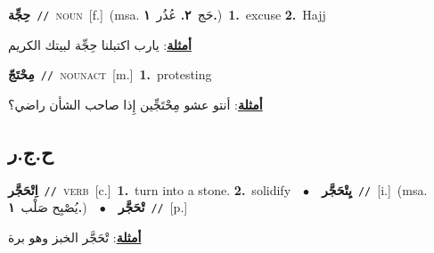 \documentclass[10pt,a4paper,twoside]{article} %
\begin{document}
\begin{multicols}{2}
{{{{{{{{{{{\setlength\topsep{0pt}\textbf{\foreignlanguage{arabic}{حِجِّة}}\ {\color{gray}\texttt{//}\color{black}}\ \textsc{noun}\ [f.]\ \color{gray}(msa. \foreignlanguage{arabic}{حَج}~\foreignlanguage{arabic}{\textbf{٢.}}  \foreignlanguage{arabic}{عُذُر}~\foreignlanguage{arabic}{\textbf{١.}})\color{black}\ \textbf{1.}~excuse  \textbf{2.}~Hajj\  \begin{flushright}\color{gray}\foreignlanguage{arabic}{\textbf{\underline{\foreignlanguage{arabic}{أمثلة}}}: يارب اكتبلنا حِجِّة لبيتك الكريم}\end{flushright}\color{black}} \vspace{2mm}

{\setlength\topsep{0pt}\textbf{\foreignlanguage{arabic}{مِحْتَجّ}}\ {\color{gray}\texttt{//}\color{black}}\ \textsc{noun\textunderscore act}\ [m.]\ \textbf{1.}~protesting\  \begin{flushright}\color{gray}\foreignlanguage{arabic}{\textbf{\underline{\foreignlanguage{arabic}{أمثلة}}}: أنتو عشو مِحْتَجِّين إِذا صاحب الشأن راضي؟}\end{flushright}\color{black}} \vspace{2mm}

\vspace{-3mm}
\subsection*{\color{blue}\foreignlanguage{arabic}{ح.ج.ر}\color{blue}{}} 

{\setlength\topsep{0pt}\textbf{\foreignlanguage{arabic}{اِتْحَجَّر}}\ {\color{gray}\texttt{//}\color{black}}\ \textsc{verb}\ [c.]\ \textbf{1.}~turn into a stone.  \textbf{2.}~solidify\ \ $\bullet$\ \ \setlength\topsep{0pt}\textbf{\foreignlanguage{arabic}{يِتْحَجَّر}}\ {\color{gray}\texttt{//}\color{black}}\ [i.]\ \color{gray}(msa. \foreignlanguage{arabic}{يُصْبِح صَلْب}~\foreignlanguage{arabic}{\textbf{١.}})\color{black}\ \ $\bullet$\ \ \setlength\topsep{0pt}\textbf{\foreignlanguage{arabic}{تْحَجَّر}}\ {\color{gray}\texttt{//}\color{black}}\ [p.]\  \begin{flushright}\color{gray}\foreignlanguage{arabic}{\textbf{\underline{\foreignlanguage{arabic}{أمثلة}}}: تْحَجَّر الخبز وهو برة}\end{flushright}\color{black}} \vspace{2mm}

}}}}}}}}}}
\end{multicols}
\end{document}
